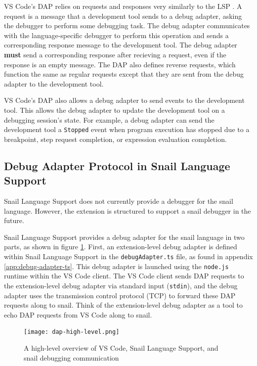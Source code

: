 \documentclass{article}
\begin{document}
VS Code's DAP relies on requests and responses very similarly to the LSP \cite{Microsoft_2021b}. A request is a message that a development tool sends to a debug adapter, asking the debugger to perform some debugging task. The debug adapter communicates with the language-specific debugger to perform this operation and sends a corresponding response message to the development tool. The debug adapter \textbf{must} send a corresponding response after recieving a request, even if the response is an empty message. The DAP also defines reverse requests, which function the same as regular requests except that they are sent from the debug adapter to the development tool.

VS Code's DAP also allows a debug adapter to send events to the development tool. This allows the debug adapter to update the development tool on a debugging session's state. For example, a debug adapter can send the development tool a \lstinline{Stopped} event when program execution has stopped due to a breakpoint, step request completion, or expression evaluation completion. 

\subsection{Debug Adapter Protocol in Snail Language Support}

Snail Language Support does not currently provide a debugger for the snail language. However, the extension is structured to support a snail debugger in the future. 

Snail Language Support provides a debug adapter for the snail language in two parts, as shown in figure \ref{fig:dap-high-level}. First, an extension-level debug adapter is defined within Snail Language Support in the \lstinline{debugAdapter.ts} file, as found in appendix \ref{app:debug-adapter-ts}. This debug adapter is launched using the \lstinline{node.js} runtime within the VS Code client. The VS Code client sends DAP requests to the extension-level debug adapter via standard input (\lstinline{stdin}), and the debug adapter uses the transmission control protocol (TCP) to forward these DAP requests along to snail. Think of the extension-level debug adapter as a tool to echo DAP requests from VS Code along to snail. 

\begin{figure}
    \begin{center}
        \texttt{[image: dap-high-level.png]}
        \caption{
            \centering 
            A high-level overview of VS Code, Snail Language Support, and snail debugging communication
        }
        \label{fig:dap-high-level}
    \end{center}
\end{figure}
\end{document}
